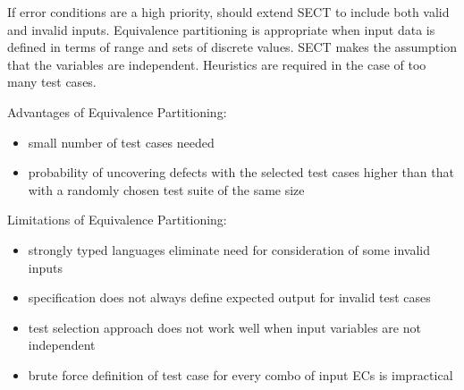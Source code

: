 \documentclass[11pt]{article}
\begin{document}
If error conditions are a high priority, should extend SECT to include
both valid and invalid inputs.
Equivalence partitioning is appropriate when input data is defined in
terms of range and sets of discrete values.
SECT makes the assumption that the variables are independent.
Heuristics are required in the case of too many test cases.

Advantages of Equivalence Partitioning:
\begin{itemize}
\item small number of test cases needed
\item probability of uncovering defects with the selected test cases higher than that
with a randomly chosen test suite of the same size
\end{itemize}

Limitations of Equivalence Partitioning:
\begin{itemize}
\item strongly typed languages eliminate need for consideration of some invalid inputs
\item specification does not always define expected output for invalid test cases
\item test selection approach does not work well when input variables are not
independent
\item brute force definition of test case for every combo of input ECs is impractical
\end{itemize}
\end{document}
